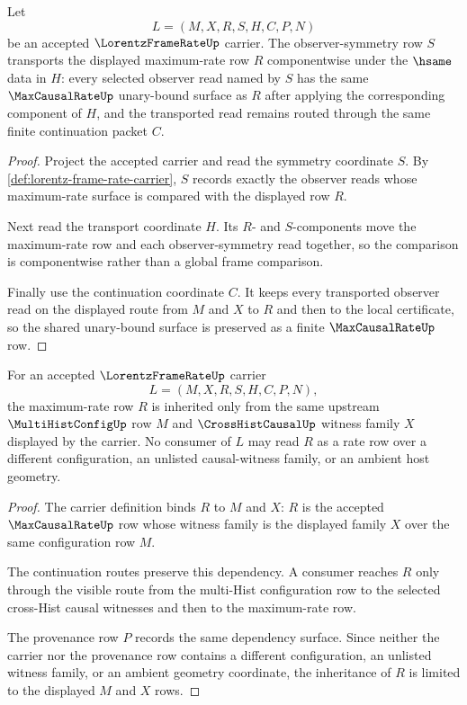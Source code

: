 \begin{theorem}
\label{thm:frame-rate-observer-symmetry-transport}
Let
$$
L=(M,X,R,S,H,C,P,N)
$$
be an accepted $\LorentzFrameRateUp$ carrier. The observer-symmetry row $S$ transports the displayed maximum-rate row $R$ componentwise under the $\hsame$ data in $H$: every selected observer read named by $S$ has the same $\MaxCausalRateUp$ unary-bound surface as $R$ after applying the corresponding component of $H$, and the transported read remains routed through the same finite continuation packet $C$.
\end{theorem}
\begin{proof}
Project the accepted carrier and read the symmetry coordinate $S$. By \autoref{def:lorentz-frame-rate-carrier}, $S$ records exactly the observer reads whose maximum-rate surface is compared with the displayed row $R$.

Next read the transport coordinate $H$. Its $R$- and $S$-components move the maximum-rate row and each observer-symmetry read together, so the comparison is componentwise rather than a global frame comparison.

Finally use the continuation coordinate $C$. It keeps every transported observer read on the displayed route from $M$ and $X$ to $R$ and then to the local certificate, so the shared unary-bound surface is preserved as a finite $\MaxCausalRateUp$ row.
\end{proof}

\begin{theorem}
\label{thm:frame-rate-rate-row-inheritance}
For an accepted $\LorentzFrameRateUp$ carrier
$$
L=(M,X,R,S,H,C,P,N),
$$
the maximum-rate row $R$ is inherited only from the same upstream $\MultiHistConfigUp$ row $M$ and $\CrossHistCausalUp$ witness family $X$ displayed by the carrier. No consumer of $L$ may read $R$ as a rate row over a different configuration, an unlisted causal-witness family, or an ambient host geometry.
\end{theorem}
\begin{proof}
The carrier definition binds $R$ to $M$ and $X$: $R$ is the accepted $\MaxCausalRateUp$ row whose witness family is the displayed family $X$ over the same configuration row $M$.

The continuation routes preserve this dependency. A consumer reaches $R$ only through the visible route from the multi-Hist configuration row to the selected cross-Hist causal witnesses and then to the maximum-rate row.

The provenance row $P$ records the same dependency surface. Since neither the carrier nor the provenance row contains a different configuration, an unlisted witness family, or an ambient geometry coordinate, the inheritance of $R$ is limited to the displayed $M$ and $X$ rows.
\end{proof}

